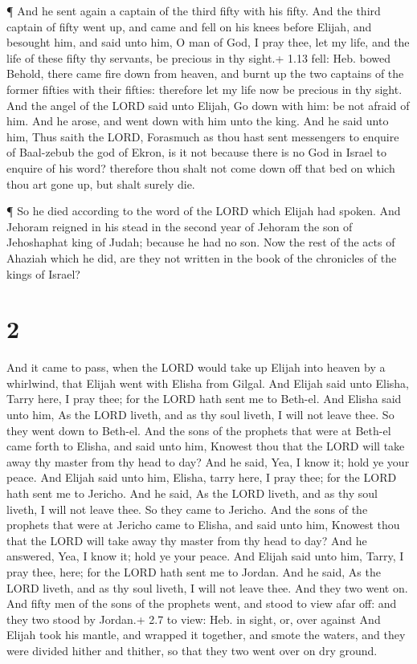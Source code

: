  ¶ And he sent again a captain of the third fifty with his
fifty. And the third captain of fifty went up, and came and fell on his
knees before Elijah, and besought him, and said unto him, O man of God,
I pray thee, let my life, and the life of these fifty thy servants, be
precious in thy sight.+ 1.13 fell: Heb. bowed  Behold,
there came fire down from heaven, and burnt up the two captains of the
former fifties with their fifties: therefore let my life now be precious
in thy sight.  And the angel of the LORD said unto Elijah,
Go down with him: be not afraid of him. And he arose, and went down with
him unto the king.  And he said unto him, Thus saith the
LORD, Forasmuch as thou hast sent messengers to enquire of Baal-zebub
the god of Ekron, is it not because there is no God in Israel to enquire
of his word? therefore thou shalt not come down off that bed on which
thou art gone up, but shalt surely die.

 ¶ So he died according to the word of the LORD which
Elijah had spoken. And Jehoram reigned in his stead in the second year
of Jehoram the son of Jehoshaphat king of Judah; because he had no son.
 Now the rest of the acts of Ahaziah which he did, are they
not written in the book of the chronicles of the kings of Israel?

\hypertarget{section-1}{%
\section{2}\label{section-1}}

 And it came to pass, when the LORD would take up Elijah
into heaven by a whirlwind, that Elijah went with Elisha from Gilgal.
 And Elijah said unto Elisha, Tarry here, I pray thee; for
the LORD hath sent me to Beth-el. And Elisha said unto him, As the LORD
liveth, and as thy soul liveth, I will not leave thee. So they went down
to Beth-el.  And the sons of the prophets that were at
Beth-el came forth to Elisha, and said unto him, Knowest thou that the
LORD will take away thy master from thy head to day? And he said, Yea, I
know it; hold ye your peace.  And Elijah said unto him,
Elisha, tarry here, I pray thee; for the LORD hath sent me to Jericho.
And he said, As the LORD liveth, and as thy soul liveth, I will not
leave thee. So they came to Jericho.  And the sons of the
prophets that were at Jericho came to Elisha, and said unto him, Knowest
thou that the LORD will take away thy master from thy head to day? And
he answered, Yea, I know it; hold ye your peace.  And Elijah
said unto him, Tarry, I pray thee, here; for the LORD hath sent me to
Jordan. And he said, As the LORD liveth, and as thy soul liveth, I will
not leave thee. And they two went on.  And fifty men of the
sons of the prophets went, and stood to view afar off: and they two
stood by Jordan.+ 2.7 to view: Heb. in sight, or, over against
 And Elijah took his mantle, and wrapped it together, and
smote the waters, and they were divided hither and thither, so that they
two went over on dry ground.

